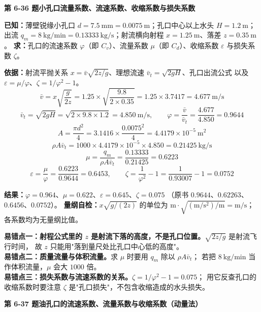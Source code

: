 \noindent\textbf{第 6-36 题\quad 小孔口流量系数、流速系数、收缩系数与损失系数}

\begin{jie}
\textbf{已知：}薄壁锐缘小孔口 $d=7.5\ \mathrm{mm}=0.0075\ \mathrm{m}$；孔口中心以上水头 $H=1.2\ \mathrm{m}$；
出流 $q_m=8\ \mathrm{kg/min}=0.13333\ \mathrm{kg/s}$；射流横向射程 $x=1.25\ \mathrm{m}$、落差 $z=0.35\ \mathrm{m}$。
\textbf{求：}孔口的流速系数 $\varphi$（即 $C_v$）、流量系数 $\mu$（即 $C_d$）、收缩系数 $\varepsilon$ 与损失系数 $\zeta$。

\textbf{依据：}射流平抛关系 $x=\bar v\sqrt{2z/g}$、理想流速 $\bar v_t=\sqrt{2gH}$、孔口出流公式
以及 $\varepsilon=\mu/\varphi$、$\zeta=1/\varphi^2-1$。
\[ \bar v=x\sqrt{\frac{g}{2z}}=1.25\times\sqrt{\frac{9.8}{2\times0.35}}=1.25\times3.7417=4.677\ \mathrm{m/s} \]
\[ \bar v_t=\sqrt{2gH}=\sqrt{2\times9.8\times1.2}=4.850\ \mathrm{m/s},\qquad
\varphi=\frac{\bar v}{\bar v_t}=\frac{4.677}{4.850}=0.9644 \]
\[ A=\frac{\pi d^2}{4}=3.1416\times\frac{0.0075^2}{4}=4.4179\times10^{-5}\ \mathrm{m^2} \]
\[ \rho A\bar v_t=1000\times4.4179\times10^{-5}\times4.850=0.21425\ \mathrm{kg/s} \]
\[ \mu=\frac{q_m}{\rho A\bar v_t}=\frac{0.13333}{0.21425}=0.6223 \]
\[ \varepsilon=\frac{\mu}{\varphi}=\frac{0.6223}{0.9644}=0.6453,\qquad
\zeta=\frac{1}{\varphi^2}-1=\frac{1}{0.93007}-1=0.0752 \]

\textbf{结果：}$\varphi=0.964$、$\mu=0.622$、$\varepsilon=0.645$、$\zeta=0.075$
（原书 $0.9644$、$0.62263$、$0.6456$、$0.0752$）。
\textbf{量纲自检：}$x\sqrt{g/(2z)}$ 的单位为 $\mathrm{m\cdot\sqrt{(m/s^2)/m}}=\mathrm{m/s}$；
各系数均为无量纲比值。
\end{jie}

\begin{yicuo}
\textbf{易错点一：射程公式里的 $z$ 是射流下落的高度，不是孔口位置。}$\sqrt{2z/g}$ 是射流飞行时间，
故 $z$ 只能用"落到量尺处比孔口中心低的高度"。\\
\textbf{易错点二：质量流量与体积流量。}求 $\mu$ 时要用 $q_m$ 除以 $\rho A\bar v_t$；
若把 $8\ \mathrm{kg/min}$ 当作体积流量，$\mu$ 会大 $1000$ 倍。\\
\textbf{易错点三：损失系数与流速系数的关系。}$\zeta=1/\varphi^2-1=0.075$；
用它反查孔口的收缩系数时要注意 $\zeta$ 是"孔口损失"，不包含收缩造成的水头损失。
\end{yicuo}

\noindent\textbf{第 6-37 题\quad 油孔口的流速系数、流量系数与收缩系数（动量法）}


